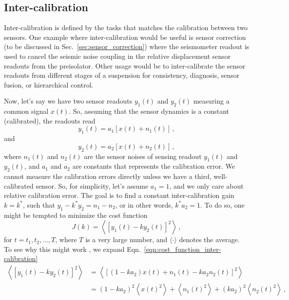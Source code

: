 \subsection{Inter-calibration}
Inter-calibration is defined by the tasks that matches the calibration between two sensors.
One example where inter-calibration would be useful is sensor correction (to be discussed in Sec.~\ref{sec:sensor_correction}) where the seismometer readout is used to cancel the seismic noise coupling in the relative displacement sensor readouts from the preisolator.
Other usage would be to inter-calibrate the sensor readouts from different stages of a suspension for consistency, diagnosis, sensor fusion, or hierarchical control.

Now, let's say we have two sensor readouts $y_1(t)$ and $y_2(t)$ measuring a common signal $x(t)$.
So, assuming that the sensor dynamics is a constant (calibrated), the readouts read
\begin{equation}
	y_1(t) = a_1\left[x(t) + n_1(t)\right]\,,
\end{equation}
and
\begin{equation}
	y_2(t) = a_2\left[x(t) + n_2(t)\right]\,,
\end{equation}
where $n_1(t)$ and $n_2(t)$ are the sensor noises of sensing readout $y_1(t)$ and $y_2(t)$, and $a_1$ and $a_2$ are constants that represents the calibration error.
We cannot measure the calibration errors directly unless we have a third, well-calibrated sensor.
So, for simplicity, let's assume $a_1=1$, and we only care about relative calibration error.
The goal is to find a constant inter-calibration gain $k=k^*$, such that $y_1 - k^* y_2 = n_1-n_2$, or in other words, $k^* a_2 = 1$.
To do so, one might be tempted to minimize the cost function
\begin{equation}
	J(k) = \left\langle \left[ y_1(t)-ky_2(t) \right]^2\right\rangle\,,
	\label{eqn:cost_function_inter-calibration}
\end{equation}
for $t={t_1,t_2,\dots,T}$, where $T$ is a very large number, and $\langle \cdot \rangle$ denotes the average.
To see why this might work , we expand Eqn.~\eqref{eqn:cost_function_inter-calibration}
\begin{equation}
	\begin{split}
		\left\langle \left[ y_1(t)-ky_2(t) \right]^2\right\rangle &= \left\langle \left[(1-ka_2)x(t) + n_1(t) - ka_2n_2(t) \right]^2 \right\rangle \\
		&= \left(1-ka_2\right)^2\left\langle x(t)^2 \right\rangle + \left\langle n_1(t)^2 \right\rangle + \left(ka_2\right)^2\left\langle n_2(t)^2 \right\rangle \,,
	\end{split}
	\label{eqn:cost_function_inter-calibration_expanded}
\end{equation}
